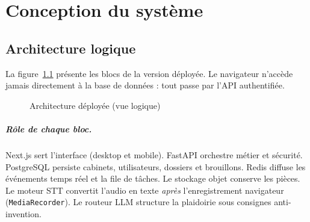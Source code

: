 \chapter{Conception du système}
\label{ch:conception}

\section{Architecture logique}

La figure~\ref{fig:archi} présente les blocs de la version déployée. Le navigateur n'accède jamais directement à la base de données : tout passe par l'API authentifiée.

\begin{figure}[H]
\centering
{}
\caption{Architecture déployée (vue logique)}
\label{fig:archi}
\end{figure}

\paragraph{Rôle de chaque bloc.}
Next.js sert l'interface (desktop et mobile). FastAPI orchestre métier et sécurité. PostgreSQL persiste cabinets, utilisateurs, dossiers et brouillons. Redis diffuse les événements temps réel et la file de tâches. Le stockage objet conserve les pièces. Le moteur STT convertit l'audio en texte \emph{après} l'enregistrement navigateur (\texttt{MediaRecorder}). Le routeur LLM structure la plaidoirie sous consignes anti-invention.

